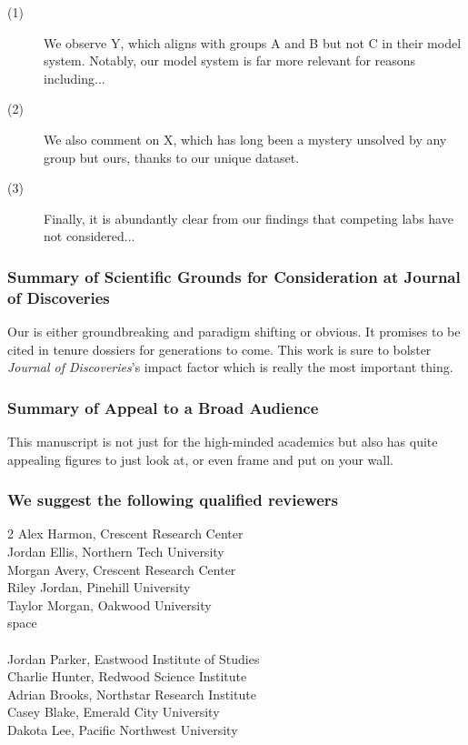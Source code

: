 \documentclass[11pt]{article}
\newcommand{\journalname}{Journal of Discoveries} %
\begin{document}
\begin{description}
  \item[(1)] We observe Y, which aligns with groups A and B but not C in their model system. Notably, our model system is far more relevant for reasons including...
  \item[(2)] We also comment on X, which has long been a mystery unsolved by any group but ours, thanks to our unique dataset.
  \item[(3)] Finally, it is abundantly clear from our findings that competing labs have not considered...
\end{description}

\subsubsection*{Summary of Scientific Grounds for Consideration at \journalname}
\noindent Our is either groundbreaking and paradigm shifting or obvious. It promises to be cited in tenure dossiers for generations to come. This work is sure to bolster \textit{\journalname}'s impact factor which is really the most important thing. 

\subsubsection*{Summary of Appeal to a Broad Audience}
\noindent This manuscript is not just for the high-minded academics but also has quite appealing figures to just look at, or even frame and put on your wall.



\subsubsection*{We suggest the following qualified reviewers}
\begin{multicols}{2}
\noindent Alex Harmon, Crescent Research Center\\
Jordan Ellis, Northern Tech University\\
Morgan Avery, Crescent Research Center\\
Riley Jordan, Pinehill University\\ 
Taylor Morgan, Oakwood University\\
{\color{white} space \\}\\
Jordan Parker, Eastwood Institute of Studies\\ 
Charlie Hunter, Redwood Science Institute\\ Adrian Brooks, Northstar Research Institute\\
Casey Blake, Emerald City University\\
Dakota Lee, Pacific Northwest University\\
\end{multicols}
\vspace{-0.75cm}
\end{document}
